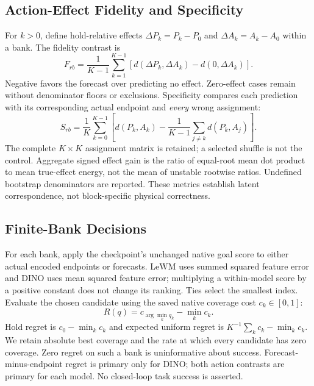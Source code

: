 \subsection{Action-Effect Fidelity and Specificity}
\label{sec:action}
For $k>0$, define hold-relative effects
$\Delta P_k=P_k-P_0$ and $\Delta A_k=A_k-A_0$ within a bank. The fidelity contrast is
\begin{equation}
 F_{rb}=\frac{1}{K-1}\sum_{k=1}^{K-1}
 \left[d(\Delta P_k,\Delta A_k)-d(0,\Delta A_k)\right].
 \label{eq:fidelity}
\end{equation}
Negative favors the forecast over predicting no effect. Zero-effect cases
remain without denominator floors or exclusions. Specificity compares each
prediction with its corresponding actual endpoint and \emph{every} wrong
assignment:
\begin{equation}
 S_{rb}=\frac{1}{K}\sum_{k=0}^{K-1}
 \left[d(P_k,A_k)-\frac{1}{K-1}\sum_{j\ne k}d(P_k,A_j)\right].
 \label{eq:specificity}
\end{equation}
The complete $K\times K$ assignment matrix is retained; a selected shuffle is
not the control. Aggregate signed effect gain is the ratio of equal-root mean
dot product to mean true-effect energy, not the mean of unstable rootwise
ratios. Undefined bootstrap denominators are reported. These metrics establish
latent correspondence, not block-specific physical correctness.

\subsection{Finite-Bank Decisions}
\label{sec:ranking}
For each bank, apply the checkpoint's unchanged native goal score to either
actual encoded endpoints or forecasts. LeWM uses summed squared feature error
and DINO uses mean squared feature error; multiplying a within-model score by a
positive constant does not change its ranking. Ties select the smallest index.
Evaluate the chosen candidate using the saved native coverage cost
$c_k\in[0,1]$:
\begin{equation}
 R(q)=c_{\arg\min_k q_k}-\min_k c_k.
 \label{eq:regret}
\end{equation}
Hold regret is $c_0-\min_k c_k$ and expected uniform regret is
$K^{-1}\sum_k c_k-\min_k c_k$. We retain absolute best coverage and the rate
at which every candidate has zero coverage. Zero regret on such a bank is
uninformative about success. Forecast-minus-endpoint regret is primary only for
DINO; both action contrasts are primary for each model. No closed-loop task
success is asserted.

